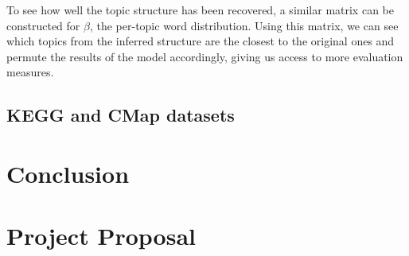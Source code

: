 \documentclass[12pt,a4paper,twoside,openright]{report}
\begin{document}
To see how well the topic structure has been recovered, a similar matrix can be constructed for $\beta$, the per-topic word distribution. Using this matrix, we can see which topics from the inferred structure are the closest to the original ones and permute the results of the model accordingly, giving us access to more evaluation measures.

\section{KEGG and CMap datasets}

\chapter{Conclusion}




\appendix

\chapter{Project Proposal}


\end{document}
